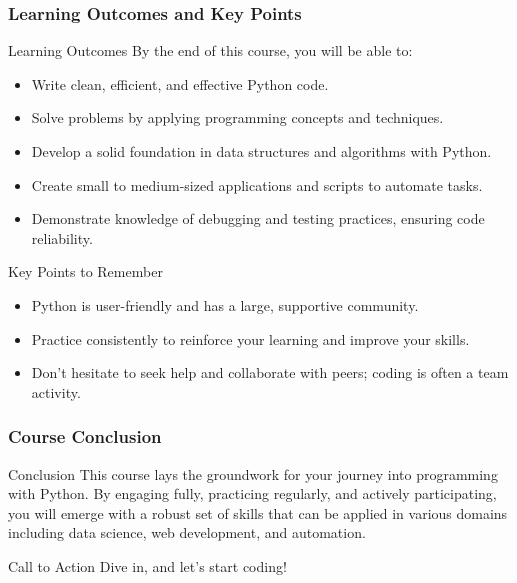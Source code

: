 \documentclass{beamer}
\begin{document}
\begin{frame}[fragile]
    \frametitle{Learning Outcomes and Key Points}
    \begin{block}{Learning Outcomes}
        By the end of this course, you will be able to:
        \begin{itemize}
            \item Write clean, efficient, and effective Python code.
            \item Solve problems by applying programming concepts and techniques.
            \item Develop a solid foundation in data structures and algorithms with Python.
            \item Create small to medium-sized applications and scripts to automate tasks.
            \item Demonstrate knowledge of debugging and testing practices, ensuring code reliability.
        \end{itemize}
    \end{block}

    \begin{block}{Key Points to Remember}
        \begin{itemize}
            \item Python is user-friendly and has a large, supportive community.
            \item Practice consistently to reinforce your learning and improve your skills.
            \item Don’t hesitate to seek help and collaborate with peers; coding is often a team activity.
        \end{itemize}
    \end{block}
\end{frame}

\begin{frame}[fragile]
    \frametitle{Course Conclusion}
    \begin{block}{Conclusion}
        This course lays the groundwork for your journey into programming with Python. By engaging fully, practicing regularly, and actively participating, you will emerge with a robust set of skills that can be applied in various domains including data science, web development, and automation. 
    \end{block}
    \begin{block}{Call to Action}
        Dive in, and let’s start coding!
    \end{block}
\end{frame}
\end{document}
